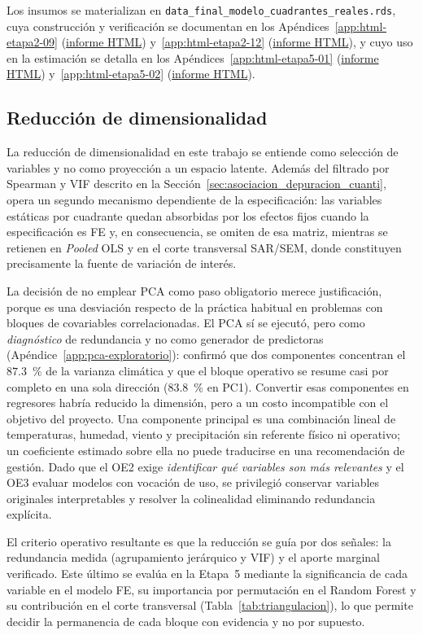 Los insumos se materializan en \texttt{data\_final\_modelo\_cuadrantes\_reales.rds}, cuya construcción y verificación se documentan en los Apéndices~\ref{app:html-etapa2-09} (\href{\urlEtapaDosNueve}{informe HTML}) y~\ref{app:html-etapa2-12} (\href{\urlEtapaDosDoce}{informe HTML}), y cuyo uso en la estimación se detalla en los Apéndices~\ref{app:html-etapa5-01} (\href{\urlEtapaCincoUno}{informe HTML}) y~\ref{app:html-etapa5-02} (\href{\urlEtapaCincoDos}{informe HTML}).

\subsection{Reducción de dimensionalidad}
\label{sec:reduccion_dimensionalidad}
La reducción de dimensionalidad en este trabajo se entiende como selección de variables y no como proyección a un espacio latente. Además del filtrado por Spearman y VIF descrito en la Sección~\ref{sec:asociacion_depuracion_cuanti}, opera un segundo mecanismo dependiente de la especificación: las variables estáticas por cuadrante quedan absorbidas por los efectos fijos cuando la especificación es FE y, en consecuencia, se omiten de esa matriz, mientras se retienen en \emph{Pooled} OLS y en el corte transversal SAR/SEM, donde constituyen precisamente la fuente de variación de interés.

La decisión de no emplear PCA como paso obligatorio merece justificación, porque es una desviación respecto de la práctica habitual en problemas con bloques de covariables correlacionadas. El PCA sí se ejecutó, pero como \textit{diagnóstico} de redundancia y no como generador de predictoras (Apéndice~\ref{app:pca-exploratorio}): confirmó que dos componentes concentran el $87{.}3$~\% de la varianza climática y que el bloque operativo se resume casi por completo en una sola dirección ($83{.}8$~\% en PC1). Convertir esas componentes en regresores habría reducido la dimensión, pero a un costo incompatible con el objetivo del proyecto. Una componente principal es una combinación lineal de temperaturas, humedad, viento y precipitación sin referente físico ni operativo; un coeficiente estimado sobre ella no puede traducirse en una recomendación de gestión. Dado que el OE2 exige \textit{identificar qué variables son más relevantes} y el OE3 evaluar modelos con vocación de uso, se privilegió conservar variables originales interpretables y resolver la colinealidad eliminando redundancia explícita.

El criterio operativo resultante es que la reducción se guía por dos señales: la redundancia medida (agrupamiento jerárquico y VIF) y el aporte marginal verificado. Este último se evalúa en la Etapa~5 mediante la significancia de cada variable en el modelo FE, su importancia por permutación en el Random Forest y su contribución en el corte transversal (Tabla~\ref{tab:triangulacion}), lo que permite decidir la permanencia de cada bloque con evidencia y no por supuesto.


